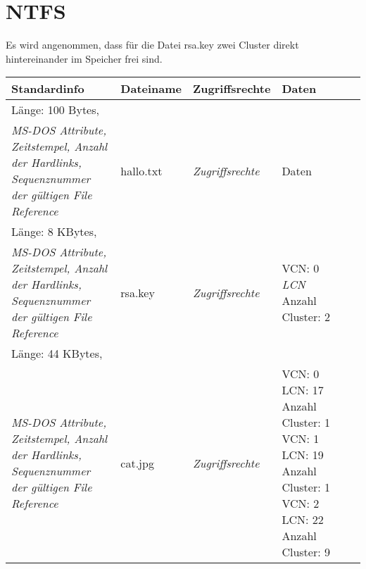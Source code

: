 \documentclass[DIN, pagenumber=false, fontsize=11pt, parskip=half]{scrartcl}
\begin{document}
    \section{NTFS}
    Es wird angenommen, dass für die Datei rsa.key zwei Cluster direkt hintereinander im Speicher frei sind.
    \begin{table}[H]
        \centering
        \begin{tabular}{p{}|p{}|p{}|p{}|p{}}
            \toprule
            Standardinfo & Dateiname & Zugriffsrechte & Daten \\
            \midrule
            Länge: 100 Bytes,\\ \textit{MS-DOS Attribute, Zeitstempel, Anzahl der Hardlinks, Sequenznummer der gültigen File Reference} & hallo.txt & \textit{Zugriffsrechte} & Daten\\
            \midrule
            Länge: 8 KBytes,\\ \textit{MS-DOS Attribute, Zeitstempel, Anzahl der Hardlinks, Sequenznummer der gültigen File Reference} & rsa.key& \textit{Zugriffsrechte} & VCN: 0 \textit{LCN} Anzahl Cluster: 2\\
            \midrule
            Länge: 44 KBytes,\\ \textit{MS-DOS Attribute, Zeitstempel, Anzahl der Hardlinks, Sequenznummer der gültigen File Reference} & cat.jpg& \textit{Zugriffsrechte} & VCN: 0 LCN: 17 Anzahl Cluster: 1\newline
                VCN: 1 LCN: 19 Anzahl Cluster: 1\newline
                VCN: 2 LCN: 22 Anzahl Cluster: 9\\
            \bottomrule
        \end{tabular}
    \end{table}
\end{document}
